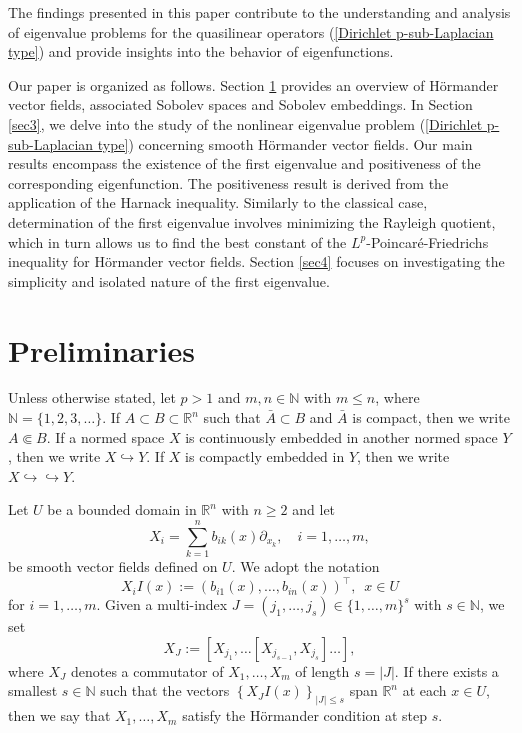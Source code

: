 \documentclass[a4paper,12pt,reqno]{amsart}
\renewcommand\eqref[1]{(\ref{#1})} %
\numberwithin{equation}{section}
\theoremstyle{plain}
\theoremstyle{definition}
\begin{document}
The findings presented in this paper contribute to the understanding and analysis of eigenvalue problems for the quasilinear operators \eqref{Dirichlet p-sub-Laplacian type} and provide insights into the behavior of eigenfunctions.  

Our paper is organized as follows. Section \ref{sec2} provides an overview of H\"ormander vector fields, associated Sobolev spaces and Sobolev embeddings. In Section \ref{sec3}, we delve into the study of the nonlinear eigenvalue problem \eqref{Dirichlet p-sub-Laplacian type} concerning smooth H\"ormander vector fields. Our main results encompass the existence of the first eigenvalue and  positiveness of the corresponding eigenfunction. The positiveness result is derived from the application of the Harnack inequality. Similarly to the classical case, determination of the first eigenvalue involves minimizing the Rayleigh quotient, which in turn allows us to find the best constant of the $L^{p}$-Poincar\'e-Friedrichs inequality for H\"ormander vector fields. Section \ref{sec4} focuses on investigating the simplicity and isolated nature of the first eigenvalue. 


\section{Preliminaries}\label{sec2}
Unless otherwise stated, let $p>1$ and $m,n\in \mathbb{N}$ with $m\leq n$, where 
$\mathbb{N}=\{1,2,3, \ldots\}$.  If $A \subset B \subset \mathbb{R}^n$ such that  $\bar{A} \subset B$ and $\bar{A}$ is compact, then we write $A \Subset B$. If a normed space $X$ is continuously embedded in another normed space $Y$, then we write $X \hookrightarrow Y$. If $X$ is compactly embedded in $Y$, then we write $X \hookrightarrow \hookrightarrow Y$.


Let $U$ be a bounded domain in $\mathbb{R}^{n}$  with $n\geq 2$ and let 
\begin{equation*}
X_{i}=\sum_{k=1}^{n} b_{ik}(x) \partial_{x_{k}}, \quad i=1,\ldots,m,
\end{equation*}
be smooth vector fields defined on $U$. We adopt the notation 
$$X_{i}I(x):=\left(b_{i1}(x),\ldots,b_{in}(x)\right)^{\top}, \enspace x\in U$$ 
for $i=1,\ldots,m$. Given a multi-index $J=\left(j_1, \ldots, j_s\right) \in\{1, \ldots, m\}^s$ with $s\in \mathbb{N}$, we set
\begin{equation*}
X_{J}:=\left[X_{j_1}, \ldots\left[X_{j_{s-1}}, X_{j_s}\right] \ldots\right],
\end{equation*}
where $X_{J}$ denotes a commutator  of   $X_1, \ldots, X_m$ of length  $s=|J|$. If there exists a smallest $s\in \mathbb{N}$ such that the vectors
$\left\{X_{J}I(x)\right\}_{|J| \leq s}$ span $\mathbb{R}^{n}$ at each $x\in U$, then we say that   $X_{1}, \ldots, X_{m}$ satisfy the H\"ormander condition at step $s$. 
\end{document}

